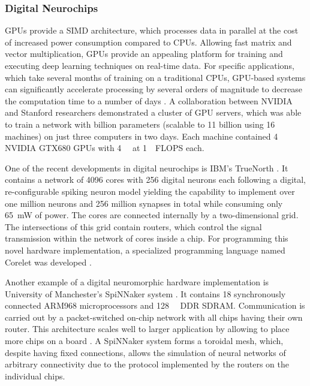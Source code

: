 \subsubsection{Digital Neurochips}

\acp{GPU} provide a \ac{SIMD} architecture, which processes data in parallel at the cost of increased power consumption \parencite{Krichmar2011, Carlson2014} compared to \acp{CPU}.
Allowing fast matrix and vector multiplication, \acp{GPU} provide an appealing platform for training and executing deep learning techniques \parencite{Schmidhuber2015} on real-time data.
For specific applications, which take several months of training on a traditional \acp{CPU}, \ac{GPU}-based systems can significantly accelerate processing by several orders of magnitude to decrease the computation time to a number of days \parencite{Edwards2015}.
A collaboration between NVIDIA and Stanford researchers demonstrated a cluster of \ac{GPU} servers, which was able to train a network with billion parameters (scalable to \num{11} billion using \num{16} machines) on just three computers in two days.
Each machine contained \num{4} NVIDIA GTX680 \acp{GPU} with \SI{4}{\giga\byte} at \SI{1}{\tera\nothing}\ac{FLOPS} each.

One of the recent developments in digital neurochips is IBM's TrueNorth \parencite{Akopyan2015}.
It contains a network of \num{4096} cores with \num{256} digital neurons each following a digital, re-configurable spiking neuron model \parencite{Cassidy2013} yielding the capability to implement over one million neurons and \num{256} million synapses in total while consuming only \SI{65}{\milli\watt} of power.
The cores are connected internally by a two-dimensional grid.
The intersections of this grid contain routers, which control the signal transmission within the network of cores inside a chip.
For programming this novel hardware implementation, a specialized programming language named Corelet was developed \parencite{Amir2013}.

Another example of a digital neuromorphic hardware implementation is University of Manchester's \ac{SpiNNaker} system \parencite{Furber2014}.
It contains \num{18} synchronously connected ARM968 microprocessors and \SI{128}{\mega\byte} \ac{DDR} \ac{SDRAM}.
Communication is carried out by a packet-switched on-chip network with all chips having their own router.
This architecture scales well to larger application by allowing to place more chips on a board \parencite{Painkras2013,Navaridas2009}.
A \ac{SpiNNaker} system forms a toroidal mesh, which, despite having fixed connections, allows the simulation of neural networks of arbitrary connectivity due to the protocol implemented by the routers on the individual chips.

